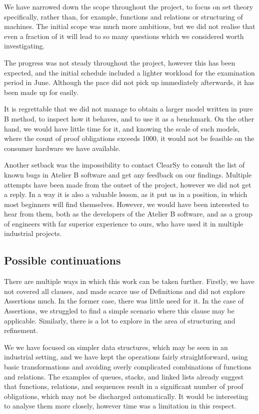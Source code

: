 \documentclass[12pt,journal,duplex]{IEEEtran}
\begin{document}
	We have narrowed down the scope throughout the project, to focus on set theory specifically, rather than, for example, functions and relations or structuring of machines. The initial scope was much more ambitious, but we did not realise that even a fraction of it will lead to so many questions which we considered worth investigating.

	The progress was not steady throughout the project, however this has been expected, and the initial schedule included a lighter workload for the examination period in June. Although the pace did not pick up immediately afterwards, it has been made up for easily.

	It is regrettable that we did not manage to obtain a larger model written in pure B method, to inspect how it behaves, and to use it as a benchmark. On the other hand, we would have little time for it, and knowing the scale of such models, where the count of proof obligations exceeds 1000, it would not be feasible on the consumer hardware we have available.

	Another setback was the impossibility to contact ClearSy to consult the list of known bugs in Atelier B software and get any feedback on our findings. Multiple attempts have been made from the outset of the project, however we did not get a reply. In a way it is also a valuable lesson, as it put us in a position, in which most beginners will find themselves. However, we would have been interested to hear from them, both as the developers of the Atelier B software, and as a group of engineers with far superior experience to ours, who have used it in multiple industrial projects.

	\subsection{Possible continuations}
	There are multiple ways in which this work can be taken further. Firstly, we have not covered all clauses, and made scarce use of Definitions and did not explore Assertions much. In the former case, there was little need for it. In the case of Assertions, we struggled to find a simple scenario where this clause may be applicable. Similarly, there is a lot to explore in the area of structuring and refinement.

	We we have focused on simpler data structures, which may be seen in an industrial setting, and we have kept the operations fairly straightforward, using basic transformations and avoiding overly complicated combinations of functions and relations. The examples of queues, stacks, and linked lists already suggest that functions, relations, and sequences result in a significant number of proof obligations, which may not be discharged automatically. It would be interesting to analyse them more closely, however time was a limitation in this respect.
\end{document}
